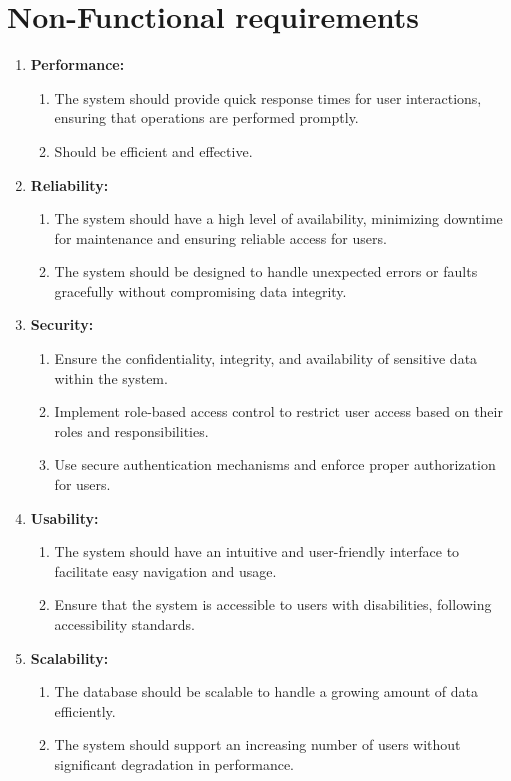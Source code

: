 \section{Non-Functional requirements}
\begin{enumerate}
    \item \textbf{Performance: }
    \begin{enumerate}
        \item The system should provide quick response times for user interactions, ensuring that operations are performed promptly.
        \item Should be efficient and effective.
    \end{enumerate}

    \item \textbf{Reliability: }
    \begin{enumerate}
        \item The system should have a high level of availability, minimizing downtime for maintenance and ensuring reliable access for users.
        \item The system should be designed to handle unexpected errors or faults gracefully without compromising data integrity.
    \end{enumerate}
    \item \textbf{Security: }
    \begin{enumerate}
        \item  Ensure the confidentiality, integrity, and availability of sensitive data within the system.
        \item Implement role-based access control to restrict user access based on their roles and responsibilities.
        \item Use secure authentication mechanisms and enforce proper authorization for users.
    \end{enumerate}

    \item \textbf{Usability: }
    \begin{enumerate}
        \item The system should have an intuitive and user-friendly interface to facilitate easy navigation and usage.
        \item Ensure that the system is accessible to users with disabilities, following accessibility standards.
    \end{enumerate}

    \item \textbf{Scalability: }
    \begin{enumerate}
        \item The database should be scalable to handle a growing amount of data efficiently.
        \item The system should support an increasing number of users without significant degradation in performance.
    \end{enumerate}


\end{enumerate}
